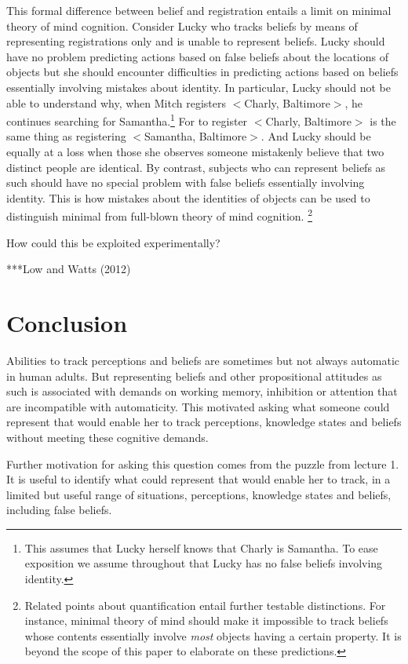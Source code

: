 \documentclass[12pt,\papersize]{extarticle}
\begin{document}
This formal difference between belief and registration entails a limit on minimal theory of mind cognition.  Consider Lucky who tracks beliefs by means of representing registrations only and is unable to represent beliefs. Lucky should have no problem predicting actions based on false beliefs about the locations of objects but she should encounter difficulties in predicting actions based on beliefs essentially involving mistakes about identity.  In particular, Lucky should not be able to understand why, when Mitch registers \(<\)Charly, Baltimore\(>\), he continues searching for Samantha.\footnote{ 	This assumes that Lucky herself knows that Charly is Samantha.  To ease exposition we assume throughout that Lucky has no false beliefs involving identity.}  For to register \(<\)Charly, Baltimore\(>\) is the same thing as registering \(<\)Samantha, Baltimore\(>\). And Lucky should be equally at a loss when those she observes someone mistakenly believe that two distinct people are identical.  By contrast, subjects who can represent beliefs as such should have no special problem with false beliefs essentially involving identity.  This is how mistakes about the identities of objects can be used to distinguish minimal from full-blown theory of mind cognition.%
\footnote{ 	
Related points about quantification entail further testable distinctions.  For instance, minimal theory of mind should make it impossible to track beliefs whose contents essentially involve \textit{most} objects having a certain property.  It is beyond the scope of this paper to elaborate on these predictions.
}

How could this be exploited experimentally?  

***Low and Watts (2012) 




\section{Conclusion}

Abilities to track 
perceptions and beliefs are  sometimes but not always  automatic in human adults.   
But representing beliefs and other propositional attitudes as such is associated with demands on working memory, inhibition or attention that are incompatible with automaticity.
This motivated asking what  someone could represent that would enable her to track perceptions, knowledge states and beliefs without meeting these cognitive demands.

Further motivation for asking this question comes from the puzzle from lecture 1.  
It is useful to identify what could represent that would enable her to track, in a limited but useful range of situations, perceptions, knowledge states and beliefs, including false beliefs.  
\end{document}
